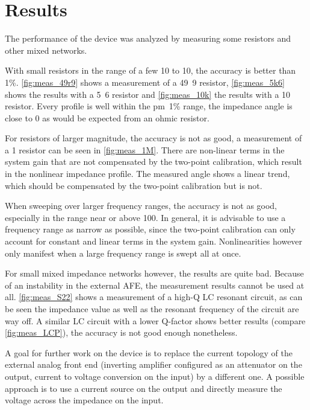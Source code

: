 \chapter{Results}

The performance of the device was analyzed by measuring some resistors and other mixed networks.

With small resistors in the range of a few \unit{10}{\ohm} to \unit{10}{\kilo\ohm}, the accuracy is better than
\unit{1}{\%}.
\autoref{fig:meas_49r9} shows a measurement of a \unit{49.9}{\ohm} resistor,
\autoref{fig:meas_5k6} shows the results with a \unit{5.6}{\kilo\ohm} resistor
and \autoref{fig:meas_10k} the results with a \unit{10}{\kilo\ohm} resistor.
Every profile is well within the \unit{\pm 1}{\%} range, the impedance angle is close to 0 as would be expected from
an ohmic resistor.

For resistors of larger magnitude, the accuracy is not as good, a measurement of a \unit{1}{\mega\ohm} resistor can be
seen in \autoref{fig:meas_1M}. There are non-linear terms in the system gain that are not compensated by the two-point
calibration, which result in the nonlinear impedance profile. The measured angle shows a linear trend, which should
be compensated by the two-point calibration but is not.

When sweeping over larger frequency ranges, the accuracy is not as good, especially in the range near or above
\unit{100}{\kilo\hertz}.
In general, it is advisable to use a frequency range as narrow as possible, since the two-point calibration can only
account for constant and linear terms in the system gain. Nonlinearities however only manifest when a large frequency
range is swept all at once.

For small mixed impedance networks however, the results are quite bad. Because of  an instability in the external AFE,
the measurement results cannot be used at all. \autoref{fig:meas_S22} shows a measurement of a high-Q LC resonant
circuit, as can be seen the impedance value as well as the resonant frequency of the circuit are way off.
A similar LC circuit with a lower Q-factor shows better results (compare \autoref{fig:meas_LCP}), the accuracy is not
good enough nonetheless.

A goal for further work on the device is to replace the current topology of the external analog front end
(inverting amplifier configured as an attenuator on the output, current to voltage conversion on the input)
by a different one. A possible approach is to use a current source on the output and directly measure the voltage
across the impedance on the input.

